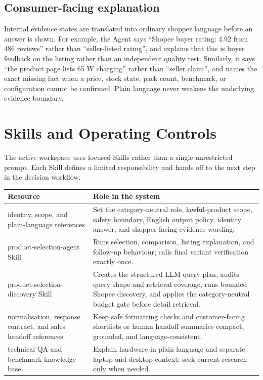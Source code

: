 \documentclass[11pt,letterpaper]{article}
\newcommand{\thead}[1]{\bfseries\centering #1\arraybackslash}
\begin{document}
\subsection{Consumer-facing explanation}

Internal evidence states are translated into ordinary shopper language before an answer is shown. For example, the Agent says ``Shopee buyer rating: 4.92 from 486 reviews'' rather than ``seller-listed rating'', and explains that this is buyer feedback on the listing rather than an independent quality test. Similarly, it says ``the product page lists 65 W charging'' rather than ``seller claim'', and names the exact missing fact when a price, stock state, pack count, benchmark, or configuration cannot be confirmed. Plain language never weakens the underlying evidence boundary.

\section{Skills and Operating Controls}

The active workspace uses focused Skills rather than a single unrestricted prompt. Each Skill defines a limited responsibility and hands off to the next step in the decision workflow.

\begin{tabularx}{\textwidth}{@{}p{2.18in}Y@{}}
\thead{Resource} & \thead{Role in the system} \\
\toprule
identity, scope, and plain-language references & Set the category-neutral role, lawful-product scope, safety boundary, English output policy, identity answer, and shopper-facing evidence wording. \\
product-selection-agent Skill & Runs selection, comparison, listing explanation, and follow-up behaviour; calls final variant verification exactly once. \\
product-selection-discovery Skill & Creates the structured LLM query plan, audits query shape and retrieval coverage, runs bounded Shopee discovery, and applies the category-neutral budget gate before detail retrieval. \\
normalisation, response contract, and sales handoff references & Keep safe formatting checks and customer-facing shortlists or human handoff summaries compact, grounded, and language-consistent. \\
technical QA and benchmark knowledge base & Explain hardware in plain language and separate laptop and desktop context; seek current research only when needed. \\
\bottomrule
\end{tabularx}
\end{document}

